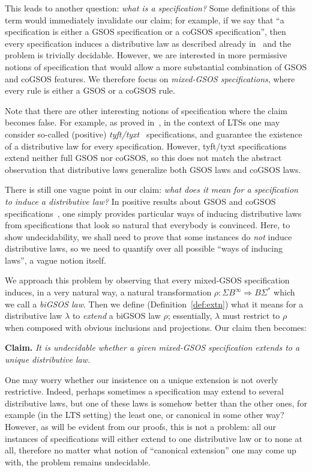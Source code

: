 \documentclass[adraft,copyright,creativecommons]{eptcs}
\newcommand{\To}{\Longrightarrow}
\newcommand{\Bb}{B^{\infty}}
\newcommand{\Ss}{\Sigma^*}
\renewcommand{\S}{\Sigma}
\begin{document}
This leads to another question: {\em what is a specification?} Some definitions of this term would immediately invalidate our claim; for example, if we say that ``a specification is either a GSOS specification or a coGSOS specification'', then every specification induces a distributive law as described already in~\cite{turiplotkin} and the problem is trivially decidable. However, we are interested in more permissive notions of specification that would allow a more substantial combination of GSOS and coGSOS features.
We therefore focus on {\em mixed-GSOS specifications}, where every rule is either a GSOS or a coGSOS rule.

Note that there are other interesting notions of specification where the claim becomes false. For example, as proved in~\cite{statontyft}, in the context of LTSs one may consider so-called (positive) {\em tyft/tyxt}~\cite{tyft} specifications, and guarantee the existence of a distributive law for every specification. However, tyft/tyxt specifications extend neither full GSOS nor coGSOS, so this does not match the abstract observation that distributive laws generalize both GSOS laws and coGSOS laws.

There is still one vague point in our claim: {\em what does it mean for a specification to induce a distributive law?}
In positive results about GSOS and coGSOS specifications~\cite{tcs11,turiplotkin}, one simply provides particular ways of inducing distributive laws from specifications that look so natural that everybody is convinced. Here, to show undecidability, we shall need to prove that some instances do {\em not} induce distributive laws, so we need to quantify over all possible ``ways of inducing laws'', a  vague notion itself.

We approach this problem by observing that every mixed-GSOS specification induces, in a very natural way, a natural transformation $\rho:\S \Bb\To B\Ss$ which we call a {\em biGSOS law}. Then we define (Definition~\ref{def:extn}) what it means for a distributive law  $\lambda$ to {\em extend} a biGSOS law $\rho$; essentially, $\lambda$ must restrict to $\rho$ when composed with obvious inclusions and projections. Our claim then becomes:

\noindent
{\bf Claim.} 
{\em It is undecidable whether a given mixed-GSOS specification extends to a unique distributive law.}

One may worry whether our insistence on a unique extension is not overly restrictive. Indeed, perhaps sometimes a specification may extend to several distributive laws, but one of these laws is somehow better than the other ones, for example (in the LTS setting) the least one, or canonical in some other way? However, as will be evident from our proofs, this is not a problem: all our instances of specifications will either extend to one distributive law or to none at all, therefore no matter what notion of ``canonical extension'' one may come up with, the problem remains undecidable.
\end{document}
